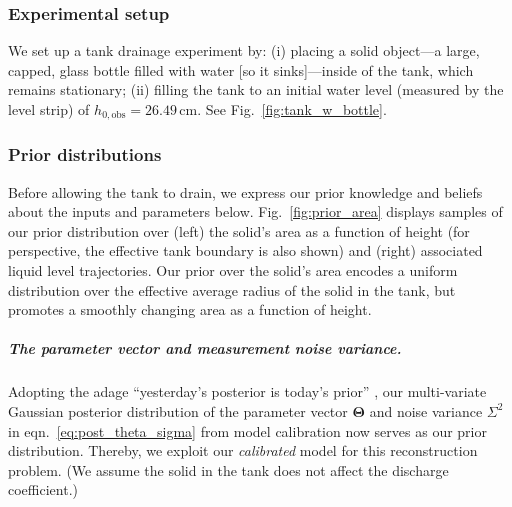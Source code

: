 \documentclass[a4paper,fleqn]{cas-dc}
\begin{document}
\subsubsection{Experimental setup}
We set up a tank drainage experiment by:
(i) placing a solid object---a large, capped, glass bottle filled with water [so it sinks]---inside of the tank, which remains stationary;
(ii) filling the tank to an initial water level (measured by the level strip) of $h_{0, \text{obs}}=26.49$\,cm. 
See Fig.~\ref{fig:tank_w_bottle}.


\subsubsection{Prior distributions}
Before allowing the tank to drain, we express our prior knowledge and beliefs about the inputs and parameters below.
Fig.~\ref{fig:prior_area} displays samples of our prior distribution over (left) the solid's area as a function of height (for perspective, the effective tank boundary is also shown) and (right) associated liquid level trajectories. 
Our prior over the solid's area encodes a uniform distribution over the effective average radius of the solid in the tank, but promotes a smoothly changing area as a function of height. 


\subparagraph{The parameter vector and measurement noise variance.}
Adopting the adage ``yesterday's posterior is today's prior'' \cite{calvetti2010subjective}, 
our multi-variate Gaussian posterior distribution of the parameter vector $\boldsymbol \Theta$ and noise variance $\Sigma^2$ in eqn.~\ref{eq:post_theta_sigma} from model calibration now serves as our prior distribution.
Thereby, we exploit our \emph{calibrated} model for this reconstruction problem.
(We assume the solid in the tank does not affect the discharge coefficient.)
\end{document}
